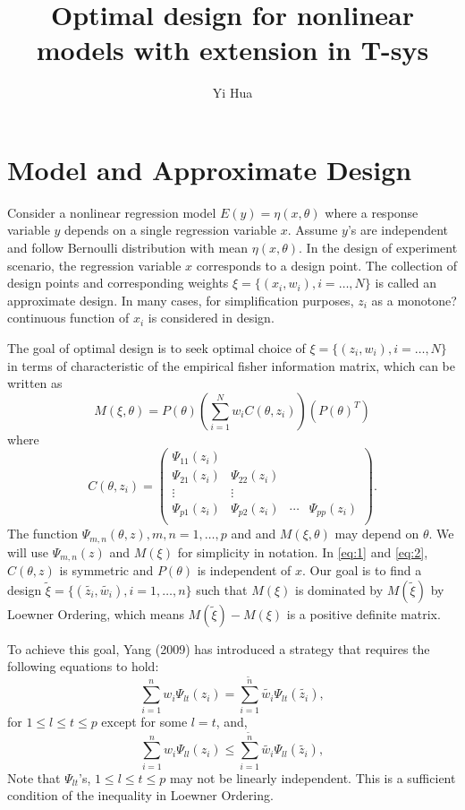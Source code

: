 \documentclass[11pt]{amsart}
\title{Optimal design for nonlinear models with extension in T-sys}
\author{Yi Hua}
\theoremstyle{definition}
\theoremstyle{remark}
\begin{document}
\maketitle
\section{Model and Approximate Design}
Consider a nonlinear regression model $ E(y) = \eta(x,\theta)$ where a response variable $y$ depends on a single regression variable $x$. Assume $y$'s are independent and follow Bernoulli distribution with mean  $\eta(x,\theta)$. In the design of experiment scenario, the regression variable $x$ corresponds to a design point. The collection of design points and corresponding weights $\xi = \{(x_i,w_i), i=\ldots,N\}$ is called an approximate design.  In many cases, for simplification purposes, $z_i$ as a monotone? continuous function of $x_i$ is considered in design. 

The goal of optimal design is to seek optimal choice of $\xi= \{(z_i,w_i), i=\ldots,N\}$  in terms of characteristic of the empirical fisher information matrix, which can be written as \begin{equation}\label{eq:1}
M(\xi,\theta) = P(\theta)(\sum_{i=1}^Nw_iC(\theta,z_i))(P(\theta)^T)
\end{equation}where \begin{equation}\label{eq:2}
C(\theta,z_i) = \left ( \begin{array}{cccc}
\Psi_{11}(z_i) &&&\\
\Psi_{21}(z_i) &\Psi_{22}(z_i)&&\\
\vdots & \vdots &&\\
\Psi_{p1}(z_i) &\Psi_{p2}(z_i)&\cdots&\Psi_{pp}(z_i)\\
\end{array} \right).\end{equation}
The function $\Psi_{m,n}(\theta,z), m,n=1,\ldots,p$  and and $M(\xi,\theta)$ may depend on $\theta$. We will use $  \Psi_{m,n}(z)$ and $M(\xi)$ for simplicity in notation. In \eqref{eq:1} and \eqref{eq:2}, $C(\theta,z)$ is symmetric and $P(\theta)$ is independent of $x$. Our goal is to find a design $\tilde{\xi} = \{(\tilde{z_i},\tilde{w_i}), i=1,\ldots,n\}$ such that $M(\xi)$ is dominated by $M(\tilde{\xi})$ by Loewner Ordering, which means $ M(\tilde{\xi})-M(\xi)$ is a positive definite matrix.

To achieve this goal, Yang (2009) has introduced a strategy that requires the following equations to hold:
\begin{equation}\label{eq: strategy1}
\sum_{i=1}^{n} w_i \Psi_{lt}(z_i) =\sum_{i=1}^{\tilde{n}} \tilde{w_i} \Psi_{lt}(\tilde{z_i}),\end{equation} for $1\le l\le t \le p$ except for some $l=t $, and, \begin{equation}\label{eq: strategy2}
\sum_{i=1}^{n} w_i \Psi_{ll}(z_i) \le \sum_{i=1}^{\tilde{n}} \tilde{w_i} \Psi_{ll}(\tilde{z_i}), \end{equation} 
Note that $\Psi_{lt}$'s, $1 \le l \le t \le p$ may not be linearly independent. This is a sufficient condition of the inequality in Loewner Ordering.
\end{document}
